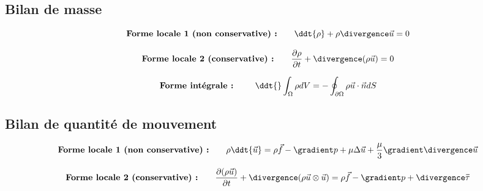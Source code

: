 \subsection{Bilan de masse}

\begin{equation}
\mbox{\bf Forme locale 1 (non conservative)  :} 
\qquad  
\ddt{\rho} + \rho \divergence \vec{u} = 0
\end{equation}

\begin{equation}
\mbox{\bf Forme locale 2 (conservative) :}
\qquad  
\dpa{\rho}{t} + \divergence ( \rho \vec{u})  = 0
\end{equation}

\begin{equation}
\mbox{\bf Forme intégrale : } 
\qquad  
\ddt{} \int_{\Omega}  \rho dV = - \oint_{\partial \Omega} \rho \vec{u} \cdot \vec{n} dS
\end{equation}


\subsection{Bilan de quantité de mouvement}

\begin{equation}
\mbox{\bf Forme locale 1 (non conservative)  :} 
\qquad  
		\rho \ddt{\vec{u}} 
		= 
		\rho \vec{f}  - \gradient p + \mu \Delta \vec{u} + \frac{\mu}{3} \gradient \divergence \vec{u} 
\end{equation}
	
	

\begin{equation}
\mbox{\bf Forme locale 2 (conservative) :}
\qquad  
	 \dpa{(\rho \vec{u})}{t} + \divergence (\rho \vec{u} \otimes \vec{u})
		= \rho \vec{f}  - \gradient p + \divergence \mytensor{\tau}
\end{equation}

